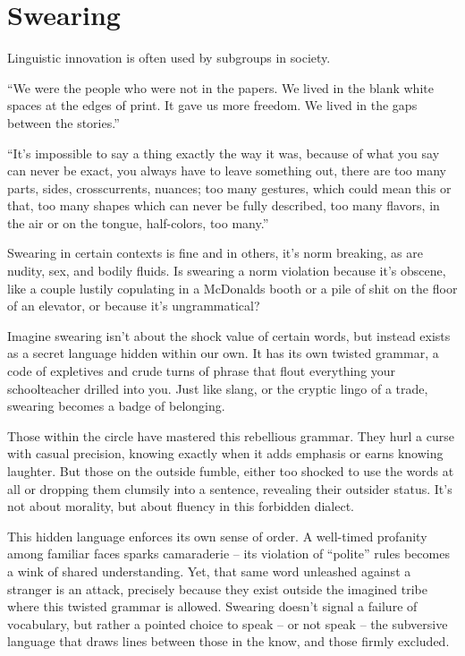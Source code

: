 \section{Swearing}



Linguistic innovation is often used by subgroups in society.

“We were the people who were not in the papers. We lived in the blank white spaces at the edges of print. It gave us more freedom.
We lived in the gaps between the stories.”

“It's impossible to say a thing exactly the way it was, because of what you say can never be exact, you always have to leave something out, there are too many parts, sides, crosscurrents, nuances; too many gestures, which could mean this or that, too many shapes which can never be fully described, too many flavors, in the air or on the tongue, half-colors, too many.”

Swearing in certain contexts is fine and in others, it's norm breaking, as are nudity, sex, and bodily fluids. Is swearing a norm violation because it's obscene, like a couple lustily copulating in a McDonalds booth or a pile of shit on the floor of an elevator, or because it's ungrammatical?

Imagine swearing isn't about the shock value of certain words, but instead exists as a secret language hidden within our own. It has its own twisted grammar, a code of expletives and crude turns of phrase that flout everything your schoolteacher drilled into you. Just like slang, or the cryptic lingo of a trade, swearing becomes a badge of belonging.

Those within the circle have mastered this rebellious grammar. They hurl a curse with casual precision, knowing exactly when it adds emphasis or earns knowing laughter.  But those on the outside fumble, either too shocked to use the words at all or dropping them clumsily into a sentence, revealing their outsider status. It's not about morality, but about fluency in this forbidden dialect.

This hidden language enforces its own sense of order. A well-timed profanity among familiar faces sparks camaraderie – its violation of “polite” rules becomes a wink of shared understanding. Yet, that same word unleashed against a stranger is an attack, precisely because they exist outside the imagined tribe where this twisted grammar is allowed. Swearing doesn't signal a failure of vocabulary, but rather a pointed choice to speak – or not speak – the subversive language that draws lines between those in the know, and those firmly excluded.

